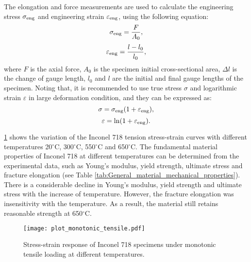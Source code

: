 The elongation and force measurements are used to calculate the engineering stress $\sigma_{\rm eng}$ and engineering strain $\varepsilon_{\rm eng}$, using the following equation:
\begin{equation}
\sigma_{\rm eng}=\frac{F}{A_0},
\end{equation}
\begin{equation}
\varepsilon_{\rm eng}=\frac{l-l_0}{l_0},
\end{equation}
where $F$ is the axial force, $A_0$ is the specimen initial cross-sectional area, $\Delta l$ is the change of gauge length, $l_0$ and $l$ are the initial and final gauge lengths of the specimen.
Noting that, it is recommended to use true stress $\sigma$ and logarithmic strain $\varepsilon$ in large deformation condition, and they can be expressed as:
\begin{equation}
\sigma=\sigma_{\rm eng}(1+\varepsilon_{\rm eng}),
\end{equation}
\begin{equation}
\varepsilon=\ln(1+\varepsilon_{\rm eng}).
\end{equation}

\ref{Fig:plot_monotonic_tensile} shows the variation of the Inconel 718 tension stress-strain curves with different temperatures 20$^{\circ}$C, 300$^{\circ}$C, 550$^{\circ}$C and 650$^{\circ}$C.
The fundamental material properties of Inconel 718 at different temperatures can be determined from the experimental data, such as Young's modulus, yield strength, ultimate stress and fracture elongation (see Table \ref{tab:General_material_mechanical_properties}).
There is a considerable decline in Young's modulus, yield strength and ultimate stress with the increase of temperature.
However, the fracture elongation was insensitivity with the temperature.
As a result, the material still retains reasonable strength at 650$^{\circ}$C.

\begin{figure}[!htp]
  \centering
  \texttt{[image: plot\_monotonic\_tensile.pdf]}
  \caption{Stress-strain response of Inconel 718 specimens under monotonic tensile loading at different temperatures.}
  \label{Fig:plot_monotonic_tensile}
\end{figure}

